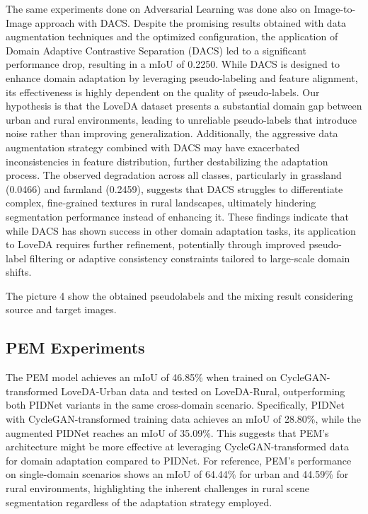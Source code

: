 \documentclass[10pt,twocolumn,letterpaper]{article}
\begin{document}
The same experiments done on Adversarial Learning was done also on Image-to-Image approach with DACS. Despite the promising results obtained with data augmentation techniques and the optimized configuration, the application of Domain Adaptive Contrastive Separation (DACS) led to a significant performance drop, resulting in a mIoU of 0.2250. While DACS is designed to enhance domain adaptation by leveraging pseudo-labeling and feature alignment, its effectiveness is highly dependent on the quality of pseudo-labels. Our hypothesis is that the LoveDA dataset presents a substantial domain gap between urban and rural environments, leading to unreliable pseudo-labels that introduce noise rather than improving generalization.  Additionally, the aggressive data augmentation strategy combined with DACS may have exacerbated inconsistencies in feature distribution, further destabilizing the adaptation process. The observed degradation across all classes, particularly in grassland (0.0466) and farmland (0.2459), suggests that DACS struggles to differentiate complex, fine-grained textures in rural landscapes, ultimately hindering segmentation performance instead of enhancing it. These findings indicate that while DACS has shown success in other domain adaptation tasks, its application to LoveDA requires further refinement, potentially through improved pseudo-label filtering or adaptive consistency constraints tailored to large-scale domain shifts. 


The picture 4 show the obtained pseudolabels and the mixing result considering source and target images. 


\subsection{PEM Experiments}
The PEM model achieves an mIoU of 46.85\% when trained on CycleGAN-transformed LoveDA-Urban data and tested on LoveDA-Rural, outperforming both PIDNet variants in the same cross-domain scenario. Specifically, PIDNet with CycleGAN-transformed training data achieves an mIoU of 28.80\%, while the augmented PIDNet reaches an mIoU of 35.09\%. This suggests that PEM's architecture might be more effective at leveraging CycleGAN-transformed data for domain adaptation compared to PIDNet. For reference, PEM's performance on single-domain scenarios shows an mIoU of 64.44\% for urban and 44.59\% for rural environments, highlighting the inherent challenges in rural scene segmentation regardless of the adaptation strategy employed.
\end{document}
